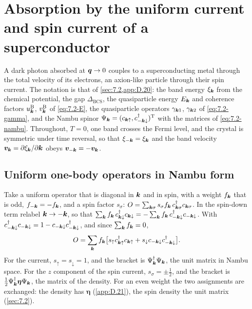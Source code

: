 \let\origsectionmark\sectionmark\renewcommand*{\sectionmark}[1]{\origsectionmark{Absorption by current and spin current}}%
\section[Absorption by the current and spin current of a superconductor]{Absorption by the uniform current and spin current of a superconductor}\label{app:D.40}
\let\sectionmark\origsectionmark

A dark photon absorbed at $\bm{q} \to 0$ couples to a superconducting metal through the total velocity of its electrons, an axion-like particle through their spin current. The notation is that of \cref{sec:7.2,app:D.20}: the band energy $\xi_{\bm{k}}$ from the chemical potential, the gap $\Delta_{\mathrm{BCS}}$, the quasiparticle energy $E_{\bm{k}}$ and coherence factors $u^{\mathrm{B}}_{\bm{k}}$, $v^{\mathrm{B}}_{\bm{k}}$ of \cref{eq:7.2-E}, the quasiparticle operators $\gamma_{\bm{k}1}$, $\gamma_{\bm{k}2}$ of \cref{eq:7.2-gamma}, and the Nambu spinor $\Psi_{\bm{k}} = (c_{\bm{k}\uparrow}, c^\dagger_{-\bm{k}\downarrow})^{\mathrm{T}}$ with the matrices of \cref{eq:7.2-nambu}. Throughout, $T = 0$, one band crosses the Fermi level, and the crystal is symmetric under time reversal, so that $\xi_{-\bm{k}} = \xi_{\bm{k}}$ and the band velocity $\bm{v}_{\bm{k}} = \partial\xi_{\bm{k}}/\partial\bm{k}$ obeys $\bm{v}_{-\bm{k}} = -\bm{v}_{\bm{k}}$.

\subsection*{Uniform one-body operators in Nambu form}

Take a uniform operator that is diagonal in $\bm{k}$ and in spin, with a weight $f_{\bm{k}}$ that is odd, $f_{-\bm{k}} = -f_{\bm{k}}$, and a spin factor $s_\sigma$: $O = \sum_{\bm{k}\sigma}s_\sigma f_{\bm{k}}\,c^\dagger_{\bm{k}\sigma}c_{\bm{k}\sigma}$. In the spin-down term relabel $\bm{k} \to -\bm{k}$, so that $\sum_{\bm{k}}f_{\bm{k}}\,c^\dagger_{\bm{k}\downarrow}c_{\bm{k}\downarrow} = -\sum_{\bm{k}}f_{\bm{k}}\,c^\dagger_{-\bm{k}\downarrow}c_{-\bm{k}\downarrow}$. With $c^\dagger_{-\bm{k}\downarrow}c_{-\bm{k}\downarrow} = 1 - c_{-\bm{k}\downarrow}c^\dagger_{-\bm{k}\downarrow}$, and since $\sum_{\bm{k}}f_{\bm{k}} = 0$,
\begin{equation}
  O = \sum_{\bm{k}}f_{\bm{k}}\bigl[s_\uparrow c^\dagger_{\bm{k}\uparrow}c_{\bm{k}\uparrow} + s_\downarrow c_{-\bm{k}\downarrow}c^\dagger_{-\bm{k}\downarrow}\bigr] .
  \label{eq:D.40-O}
\end{equation}
For the current, $s_\uparrow = s_\downarrow = 1$, and the bracket is $\Psi^\dagger_{\bm{k}}\Psi_{\bm{k}}$, the unit matrix in Nambu space. For the $z$ component of the spin current, $s_\sigma = \pm\frac12$, and the bracket is $\frac12\Psi^\dagger_{\bm{k}}\boldsymbol{\eta}\Psi_{\bm{k}}$, the matrix of the density. For an even weight the two assignments are exchanged: the density has $\boldsymbol{\eta}$ (\cref{app:D.21}), the spin density the unit matrix (\cref{sec:7.2}).

